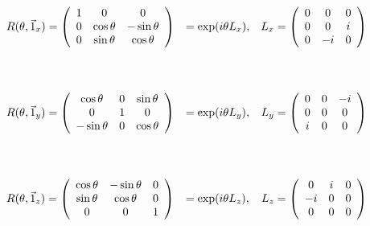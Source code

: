 \documentclass[../notesdecours.tex]{subfiles}
\begin{document}
$$
\begin{array}{llr}
    R(\theta, \vec{1}_x) = 
    \left(
        \begin{array}{ccc}
            1&0&0 \\
            0&\cos\theta& -\sin\theta\\
            0&\sin\theta& \cos\theta\\
        \end{array}
    \right) & =\exp(i\theta L_x), 
        &L_x = \left(
            \begin{array}{ccc}
                0&0&0 \\
                0&0&i \\
                0&-i&0
            \end{array}
        \right)
    \\
    \vspace{1cm} \\
    R(\theta, \vec{1}_y) = 
    \left(
        \begin{array}{ccc}
            \cos\theta & 0 & \sin\theta \\
            0&1&0 \\
            -\sin\theta & 0 & \cos\theta \\
        \end{array}
    \right) &=\exp(i\theta L_y),
        &L_y = \left(
            \begin{array}{ccc}
                0&0&-i \\
                0&0&0 \\
                i&0&0
            \end{array}
        \right)
    \\
    \vspace{1cm} \\
    R(\theta, \vec{1}_z) = 
    \left(
        \begin{array}{ccc}
            \cos\theta & -\sin\theta & 0 \\
            \sin\theta & \cos\theta & 0 \\
            0&0&1 \\
        \end{array}
    \right) &=\exp(i\theta L_z),
        &L_z = \left(
            \begin{array}{ccc}
                0&i&0 \\
                -i&0&0 \\
                0&0&0
            \end{array}
        \right)
\end{array}
$$
\end{document}
